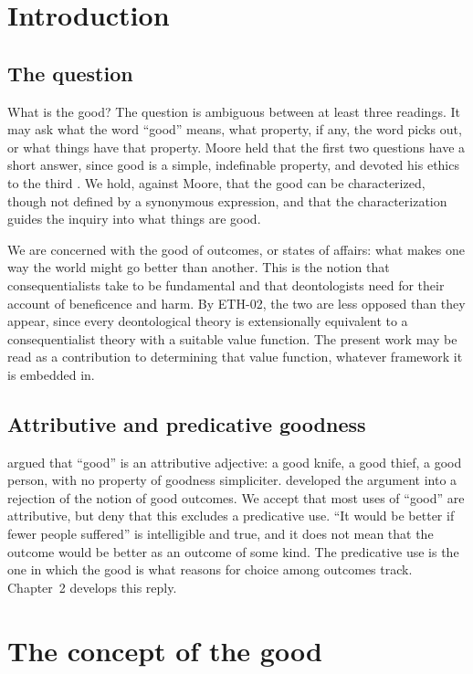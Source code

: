 \documentclass{situationist-preprint}
\begin{document}
\section{Introduction}

\subsection{The question}

What is the good? The question is ambiguous between at least three readings. It may ask what the word \enquote{good} means, what property, if any, the word picks out, or what things have that property. Moore held that the first two questions have a short answer, since good is a simple, indefinable property, and devoted his ethics to the third \citep{Moore1903}. We hold, against Moore, that the good can be characterized, though not defined by a synonymous expression, and that the characterization guides the inquiry into what things are good.

We are concerned with the good of outcomes, or states of affairs: what makes one way the world might go better than another. This is the notion that consequentialists take to be fundamental and that deontologists need for their account of beneficence and harm. By ETH-02, the two are less opposed than they appear, since every deontological theory is extensionally equivalent to a consequentialist theory with a suitable value function. The present work may be read as a contribution to determining that value function, whatever framework it is embedded in.

\subsection{Attributive and predicative goodness}

\citet{Geach1956} argued that \enquote{good} is an attributive adjective: a good knife, a good thief, a good person, with no property of goodness simpliciter. \citet{Thomson2008} developed the argument into a rejection of the notion of good outcomes. We accept that most uses of \enquote{good} are attributive, but deny that this excludes a predicative use. \enquote{It would be better if fewer people suffered} is intelligible and true, and it does not mean that the outcome would be better as an outcome of some kind. The predicative use is the one in which the good is what reasons for choice among outcomes track. Chapter~2 develops this reply.

\section{The concept of the good}
\end{document}
